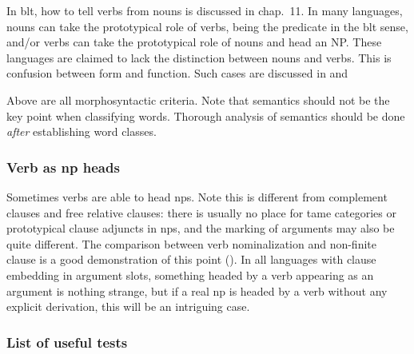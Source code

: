 \documentclass[UTF8, a4paper, oneside, scheme=plain]{ctexart}
\newcommand*{\citechap}[1]{chap.~{#1}}
\begin{document}
In \ac{blt}, how to tell verbs from nouns is discussed in \citechap{11}. 
In many languages, nouns can take the prototypical role of verbs, 
being the predicate in the \ac{blt} sense, 
and/or verbs can take the prototypical role of nouns and head an NP.  
These languages are claimed to lack the distinction between nouns and verbs. 
This is confusion between form and function.
Such cases are discussed in  and %



Above are all morphosyntactic criteria. Note that semantics should not be the key point when classifying words.
Thorough analysis of semantics should be done \emph{after} establishing word classes.

\subsubsection{Verb as \ac{np} heads}\label{sec:verb-as-np-head}

Sometimes verbs are able to head \ac{np}s.
Note this is different from complement clauses and free relative clauses:
there is usually no place for \ac{tame} categories or prototypical clause adjuncts in \ac{np}s,
and the marking of arguments may also be quite different.
The comparison between verb nominalization and non-finite clause is a good demonstration of this point
().
In all languages with clause embedding in argument slots,
something headed by a verb appearing as an argument is nothing strange,
but if a real \ac{np} is headed by a verb without any explicit derivation,
this will be an intriguing case.

\subsubsection{List of useful tests}
\end{document}
